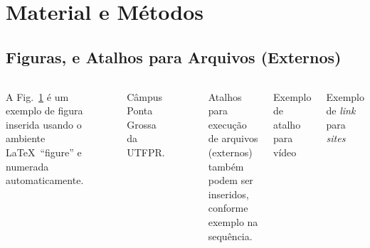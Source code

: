 \documentclass[%
  10pt,%
  aspectratio = 43,%
  compress,%
  t,%
  english,%
  brazilian,%
]{beamer}
\begin{document}
\section{Material e Métodos}\label{sec:matmet}

\subsection{Figuras, e Atalhos para Arquivos (Externos)}\label{ssec:matmet1}

\begin{frame}
\begin{columns}[T]
A Fig.~\ref{fig:campuspontagrossa} é um exemplo de figura inserida usando o ambiente \LaTeX\ \enquote{figure} e numerada automaticamente.
\begin{figure}[!htb]
\centering%
\caption{Câmpus Ponta Grossa da UTFPR.}%
\label{fig:campuspontagrossa}
\end{figure}
Atalhos para execução de arquivos (externos) também podem ser inseridos, conforme exemplo na sequência.
\begin{block}{Exemplo de atalho para vídeo}
\href{http://tex.stackexchange.com/q/20800/5701}{}
\end{block}
\begin{block}{Exemplo de {\it link} para {\it sites}}
\href{http://www.ppgse.ct.utfpr.edu.br}{}
\end{block}
\end{columns}
\end{frame}
\end{document}
